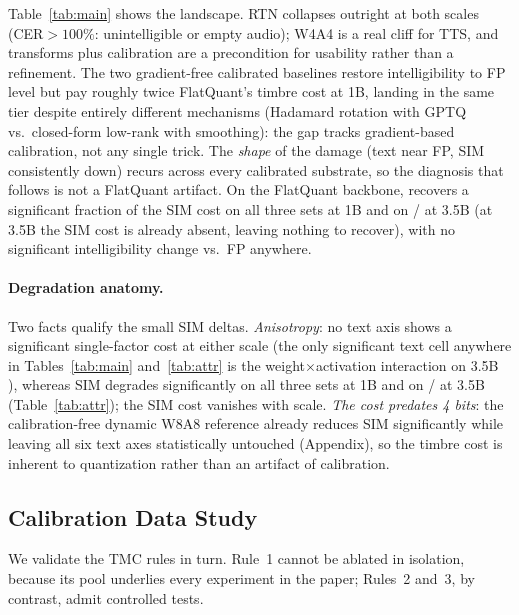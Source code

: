 Table~\ref{tab:main} shows the landscape. RTN collapses outright at both scales (CER${>}100\%$: unintelligible or empty audio); W4A4 is a real cliff for TTS, and transforms plus calibration are a precondition for usability rather than a refinement. The two gradient-free calibrated baselines restore intelligibility to FP level but pay roughly twice FlatQuant's timbre cost at 1B, landing in the same tier despite entirely different mechanisms (Hadamard rotation with GPTQ vs.\ closed-form low-rank with smoothing): the gap tracks gradient-based calibration, not any single trick. The \emph{shape} of the damage (text near FP, SIM consistently down) recurs across every calibrated substrate, so the diagnosis that follows is not a FlatQuant artifact. On the FlatQuant backbone,  recovers a significant fraction of the SIM cost on all three sets at 1B and on \zh{}/\en{} at 3.5B (at 3.5B the \hard{} SIM cost is already absent, leaving nothing to recover), with no significant intelligibility change vs.\ FP anywhere.

\paragraph{Degradation anatomy.}
Two facts qualify the small SIM deltas. \emph{Anisotropy}: no text axis shows a significant single-factor cost at either scale (the only significant text cell anywhere in Tables~\ref{tab:main} and~\ref{tab:attr} is the weight$\times$activation interaction on 3.5B \zh{}), whereas SIM degrades significantly on all three sets at 1B and on \zh{}/\en{} at 3.5B (Table~\ref{tab:attr}); the \hard{} SIM cost vanishes with scale. \emph{The cost predates 4 bits}: the calibration-free dynamic W8A8 reference already reduces SIM significantly while leaving all six text axes statistically untouched (Appendix), so the timbre cost is inherent to quantization rather than an artifact of calibration.

\subsection{Calibration Data Study}
\label{sec:dataexp}

We validate the TMC rules in turn. Rule~1 cannot be ablated in isolation, because its pool underlies every experiment in the paper; Rules~2 and~3, by contrast, admit controlled tests.

